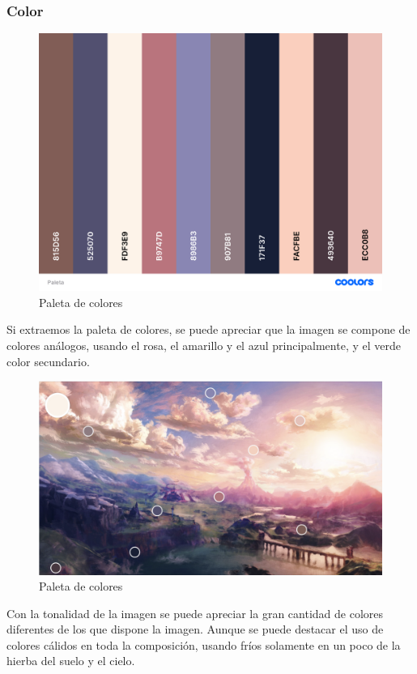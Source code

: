 \documentclass[12pt]{article}
\begin{document}
        \subsubsection{Color}
        
          \begin{figure}[H]
            \centering
            \includegraphics[scale = 0.2]{Jesus/Seccion2/Paleta.png}
            \caption{Paleta de colores}
          \end{figure}
          Si extraemos la paleta de colores, se puede apreciar que la imagen se compone de colores análogos, usando el rosa, el amarillo y el azul principalmente, y el verde color secundario. 
          
          \newpage
          
          \begin{figure}[H]
            \centering
            \includegraphics[scale = 0.5]{Jesus/Seccion2/Tonalidad.png}
            \caption{Paleta de colores}
          \end{figure}
          Con la tonalidad de la imagen se puede apreciar la gran cantidad de colores diferentes de los que dispone la imagen. Aunque se puede destacar el uso de colores cálidos en toda la composición, usando fríos solamente en un poco de la hierba del suelo y el cielo. 
          
\end{document}
